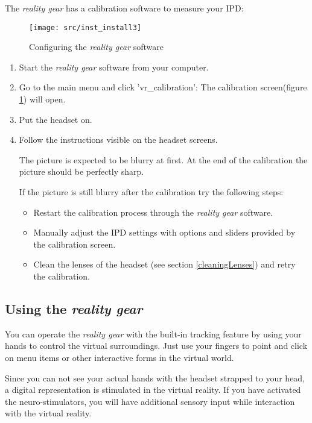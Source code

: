 The \emph{\poke{} reality gear} has a calibration software to measure your IPD:
\begin{figure}[!ht]
\begin{center}
\texttt{[image: src/inst\_install3]}
\end{center}
\caption[Configuring the \emph{\pokeT{} reality gear} software]{Configuring the \emph{\poke{} reality gear} software}
\label{gear_ipd}
\end{figure}
\begin{enumerate}
\item Start the \emph{\poke{} reality gear} software from your computer.
\item Go to the main menu and click 'vr\_calibration': The calibration screen(figure \ref{gear_ipd}) will open.
\item Put the headset on.
\item Follow the instructions visible on the headset screens.

The picture is expected to be blurry at first. At the end of the calibration the picture should be perfectly sharp.

If the picture is still blurry after the calibration try the following steps:
\begin{itemize}
\item Restart the calibration process through the \emph{\poke{} reality gear} software.
\item Manually adjust the IPD settings with options and sliders provided by the calibration screen.
\item Clean the lenses of the headset (see section \ref{cleaningLenses}) and retry the calibration.
\end{itemize}
\end{enumerate}

\subsection[Using the \emph{\pokeT{} reality gear}]{Using the \emph{\poke{} reality gear}}

You can operate the \emph{\poke{} reality gear} with the built-in tracking feature by using your hands to control the virtual surroundings. Just use your fingers to point and click on menu items or other interactive forms in the virtual world.

Since you can not see your actual hands with the headset strapped to your head, a digital representation is stimulated in the virtual reality. If you have activated the neuro-stimulators, you will have additional sensory input while interaction with the virtual reality.

